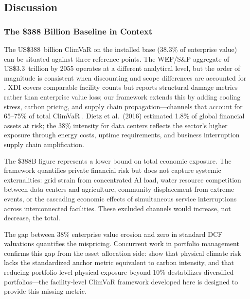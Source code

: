 \subsection*{Discussion}\label{toc:discussion}
\greensep

\begin{twocolbody}

\subsubsection*{The \$388 Billion Baseline in Context}

\noindent The US\$388~billion ClimVaR on the installed base (38.3\% of enterprise value) can be situated against three reference points. The WEF/S\&P aggregate of US\$3.3~trillion by 2055 operates at a different analytical level, but the order of magnitude is consistent when discounting and scope differences are accounted for \citep{wef2025}. XDI covers comparable facility counts but reports structural damage metrics rather than enterprise value loss; our framework extends this by adding cooling stress, carbon pricing, and supply chain propagation---channels that account for 65--75\% of total ClimVaR \citep{xdi2025}. Dietz et al.\ (2016) estimated 1.8\% of global financial assets at risk; the 38\% intensity for data centers reflects the sector's higher exposure through energy costs, uptime requirements, and business interruption supply chain amplification.

The \$388B figure represents a lower bound on total economic exposure. The framework quantifies private financial risk but does not capture systemic externalities: grid strain from concentrated AI load, water resource competition between data centers and agriculture, community displacement from extreme events, or the cascading economic effects of simultaneous service interruptions across interconnected facilities. These excluded channels would increase, not decrease, the total.

The gap between 38\% enterprise value erosion and zero in standard DCF valuations quantifies the mispricing. Concurrent work in portfolio management confirms this gap from the asset allocation side: \citet{luciani2026} show that physical climate risk lacks the standardized anchor metric equivalent to carbon intensity, and that reducing portfolio-level physical exposure beyond 10\% destabilizes diversified portfolios---the facility-level ClimVaR framework developed here is designed to provide this missing metric.


\end{twocolbody}

